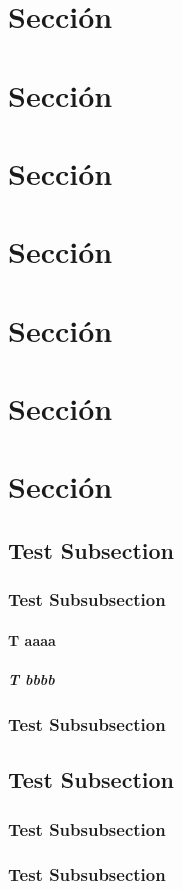 \section{Sección}
\section{Sección}
\section{Sección}
\section{Sección}
\section{Sección}
\section{Sección}
\section{Sección}
\subsection{Test Subsection}
\subsubsection{Test Subsubsection}
\paragraph{T aaaa}
\subparagraph{T bbbb}
\subsubsection{Test Subsubsection}
\subsection{Test Subsection}
\subsubsection{Test Subsubsection}
\subsubsection{Test Subsubsection}

